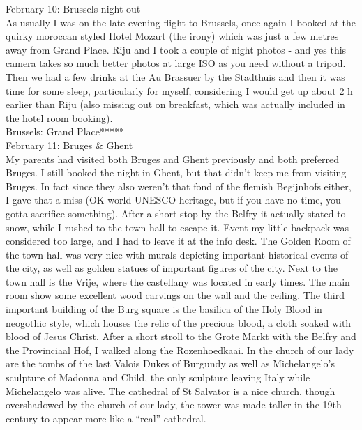 February 10: Brussels night out\\
As usually I was on the late evening flight to Brussels, once again I booked at the quirky moroccan styled Hotel Mozart (the irony) which was just a few metres away from Grand Place. Riju and I took a couple of night photos - and yes this camera takes so much better photos at large ISO as you need without a tripod. Then we had a few drinks at the Au Brassuer by the Stadthuis and then it was time for some sleep, particularly for myself, considering I would get up about 2 h earlier than Riju (also missing out on breakfast, which was actually included in the hotel room booking).\\

Brussels: Grand Place*****\\

February 11: Bruges \& Ghent\\
My parents had visited both Bruges and Ghent previously and both preferred Bruges. I still booked the night in Ghent, but that didn't keep me from visiting Bruges. In fact since they also weren't that fond of the flemish Begijnhofs either, I gave that a miss (OK world UNESCO heritage, but if you have no time, you gotta sacrifice something). After a short stop by the Belfry it actually stated to snow, while I rushed to the town hall to escape it. Event my little backpack was considered too large, and I had to leave it at the info desk. The Golden Room of the town hall was very nice with murals depicting important historical events of the city, as well as golden statues of important figures of the city. Next to the town hall is the Vrije, where the castellany was located in early times. The main room show some excellent wood carvings on the wall and the ceiling. The third important building of the Burg square is the basilica of the Holy Blood in neogothic style, which houses the relic of the precious blood, a cloth soaked with blood of Jesus Christ. After a short stroll to the Grote Markt with the Belfry and the Provinciaal Hof, I walked along the Rozenhoedkaai. In the church of our lady are the tombs of the last Valois Dukes of Burgundy as well as Michelangelo's sculpture of Madonna and Child, the only sculpture leaving Italy while Michelangelo was alive. The cathedral of St Salvator is a nice church, though overshadowed by the church of our lady, the tower was made taller in the 19th century to appear more like a ``real'' cathedral.\\
